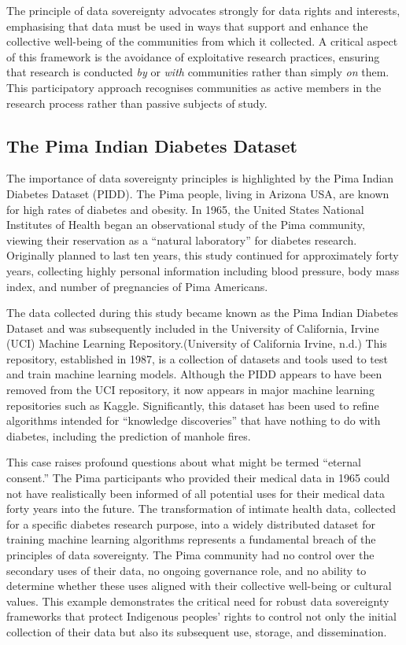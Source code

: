 \documentclass[
  a4paper,
]{memoir}
\begin{document}
The principle of data sovereignty advocates strongly for data rights and
interests, emphasising that data must be used in ways that support and
enhance the collective well-being of the communities from which it
collected. A critical aspect of this framework is the avoidance of
exploitative research practices, ensuring that research is conducted
\emph{by} or \emph{with} communities rather than simply \emph{on} them.
This participatory approach recognises communities as active members in
the research process rather than passive subjects of study.

\subsection{The Pima Indian Diabetes
Dataset}\label{the-pima-indian-diabetes-dataset}

The importance of data sovereignty principles is highlighted by the Pima
Indian Diabetes Dataset (PIDD). The Pima people, living in Arizona USA,
are known for high rates of diabetes and obesity. In 1965, the United
States National Institutes of Health began an observational study of the
Pima community, viewing their reservation as a ``natural laboratory''
for diabetes research. Originally planned to last ten years, this study
continued for approximately forty years, collecting highly personal
information including blood pressure, body mass index, and number of
pregnancies of Pima Americans.

The data collected during this study became known as the Pima Indian
Diabetes Dataset and was subsequently included in the University of
California, Irvine (UCI) Machine Learning Repository.(University of
California Irvine, n.d.) This repository, established in 1987, is a
collection of datasets and tools used to test and train machine learning
models. Although the PIDD appears to have been removed from the UCI
repository, it now appears in major machine learning repositories such
as Kaggle. Significantly, this dataset has been used to refine
algorithms intended for ``knowledge discoveries'' that have nothing to
do with diabetes, including the prediction of manhole fires.

This case raises profound questions about what might be termed ``eternal
consent.'' The Pima participants who provided their medical data in 1965
could not have realistically been informed of all potential uses for
their medical data forty years into the future. The transformation of
intimate health data, collected for a specific diabetes research
purpose, into a widely distributed dataset for training machine learning
algorithms represents a fundamental breach of the principles of data
sovereignty. The Pima community had no control over the secondary uses
of their data, no ongoing governance role, and no ability to determine
whether these uses aligned with their collective well-being or cultural
values. This example demonstrates the critical need for robust data
sovereignty frameworks that protect Indigenous peoples' rights to
control not only the initial collection of their data but also its
subsequent use, storage, and dissemination.
\end{document}
